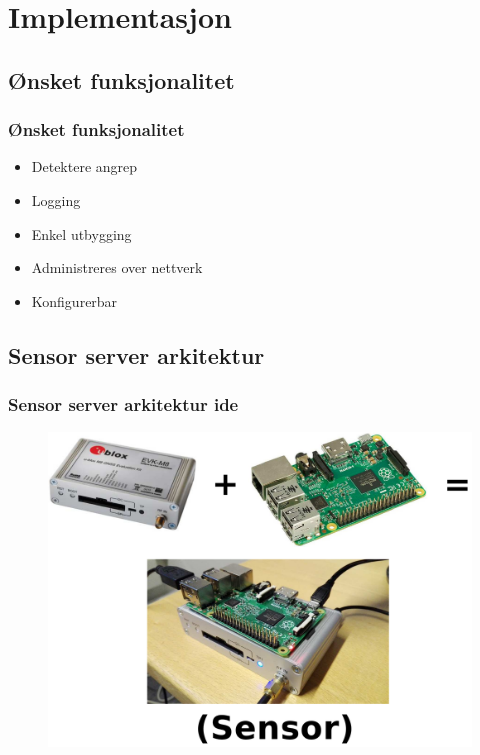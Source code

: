 \documentclass[xcolor=table]{beamer}
\begin{document}
\section{Implementasjon}
\subsection{Ønsket funksjonalitet}
\begin{frame}
  \frametitle{Ønsket funksjonalitet}
  \begin{itemize}
    \item Detektere angrep
    \item Logging
    \item Enkel utbygging
    \item Administreres over nettverk
    \item Konfigurerbar 
  \end{itemize}
\end{frame}

\subsection{Sensor server arkitektur}
\begin{frame}
  \frametitle{Sensor server arkitektur ide}
    \begin{figure}
      \includegraphics[scale=0.2]{thesis/graphics/raspi_gps.pdf}
    \end{figure}
\end{frame}
\end{document}
